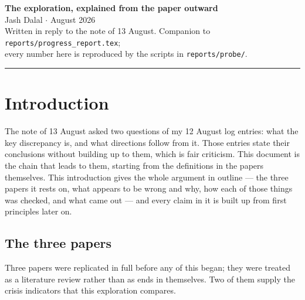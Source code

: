\documentclass[11pt,a4paper]{article}
\begin{document}
\begin{center}
{\Large\textbf{The exploration, explained from the paper outward}}\\[2mm]
{\normalsize Jash Dalal \quad$\cdot$ August 2026}\\[1mm]
{\small Written in reply to the note of 13 August. Companion to
\texttt{reports/progress\_report.tex};\\ every number here is reproduced by the
scripts in \texttt{reports/probe/}.}
\end{center}
\vspace{2mm}
\hrule
\vspace{4mm}

\section*{Introduction}

The note of 13 August asked two questions of my 12 August log entries: what
the key discrepancy is, and what directions follow from it. Those entries state
their conclusions without building up to them, which is fair criticism. This
document is the chain that leads to them, starting from the definitions in the
papers themselves. This introduction gives the whole argument in outline --- the
three papers it rests on, what appears to be wrong and why, how each of those
things was checked, and what came out --- and every claim in it is built up from
first principles later on.

\subsection*{The three papers}

Three papers were replicated in full before any of this began; they were treated
as a literature review rather than as ends in themselves. Two of them supply the
crisis indicators that this exploration compares.
\end{document}
